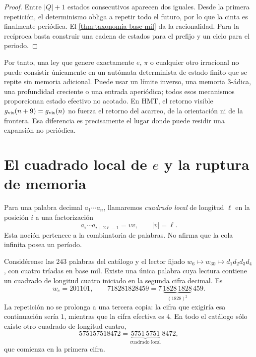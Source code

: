 \begin{proof}
Entre \(|Q|+1\) estados consecutivos aparecen dos iguales. Desde la primera
repetición, el determinismo obliga a repetir todo el futuro, por lo que la
cinta es finalmente periódica. El \cref{thm:taxonomia-base-mil} da la
racionalidad. Para la recíproca basta construir una cadena de estados para el
prefijo y un ciclo para el periodo.
\end{proof}

Por tanto, una ley que genere exactamente \(e\), \(\pi\) o cualquier otro
irracional no puede consistir únicamente en un autómata determinista de
estado finito que se repite sin memoria adicional. Puede usar un límite
inverso, una memoria 3-ádica, una profundidad creciente o una entrada
aperiódica; todos esos mecanismos proporcionan estado efectivo no acotado.
En HMT, el retorno visible
\(g_{\rm vis}(n+9)=g_{\rm vis}(n)\) no fuerza el retorno del acarreo, de la
orientación ni de la frontera. Esa diferencia es precisamente el lugar donde
puede residir una expansión no periódica.

\section{El cuadrado local de \texorpdfstring{\(e\)}{e} y la ruptura de memoria}

Para una palabra decimal \(a_1\cdots a_n\), llamaremos \emph{cuadrado local}
de longitud \(\ell\) en la posición \(i\) a una factorización
\[
 a_i\cdots a_{i+2\ell-1}=vv,
 \qquad |v|=\ell.
\]
Esta noción pertenece a la combinatoria de palabras. No afirma que la cola
infinita posea un período.

\begin{theorem}
\label{thm:cuadrado-local-e}
Considérense las \(243\) palabras del catálogo y el lector fijado
\(w_6\mapsto w_{30}\mapsto d_1d_2d_3d_4\), con cuatro tríadas en base mil.
Existe una única palabra cuya lectura contiene un cuadrado de longitud cuatro
iniciado en la segunda cifra decimal. Es
\[
 w_e=201101,
 \qquad
 718281828459=7\,\underbrace{1828\,1828}_{(1828)^2}\,459.
\]
La repetición no se prolonga a una tercera copia: la cifra que exigiría esa
continuación sería \(1\), mientras que la cifra efectiva es \(4\). En todo el
catálogo sólo existe otro cuadrado de longitud cuatro,
\[
 575157518472=\underbrace{5751\,5751}_{\text{cuadrado local}}\,8472,
\]
que comienza en la primera cifra.
\end{theorem}

